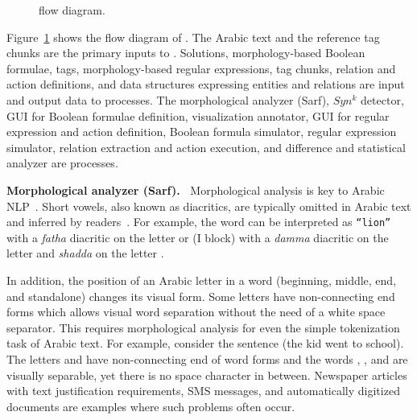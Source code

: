 \begin{figure}[tb!]
\centering
{}
\caption{\framework flow diagram.}
\label{f:overview}
\end{figure}

Figure~\ref{f:overview} shows the flow diagram of \framework. 
The Arabic text and the reference tag chunks are the primary inputs to \framework.
Solutions, morphology-based Boolean formulae, tags, 
morphology-based regular expressions, 
tag chunks, relation and action definitions, and data structures expressing entities 
and relations are input and output data to \framework processes. 
The morphological analyzer (Sarf), $Syn^k$ detector, 
GUI for Boolean formulae definition, 
visualization annotator, GUI for regular expression and action definition, 
Boolean formula simulator, regular expression simulator, 
relation extraction and action execution, and difference and statistical analyzer 
are \framework processes.

\def\pp{\ensuremath{{\cal P}}} %
\def\ss{\ensuremath{{\cal S}}} %
\def\xx{\ensuremath{{\cal X}}} %
\def\PP{\ensuremath{\mathit{POS}}} %
\def\GG{\ensuremath{\mathit{GLOSS}}} %
\def\AC{\ensuremath{\mathit{CAT}}} %

{\bf Morphological analyzer (Sarf).~}
\label{s:s:morph}
Morphological analysis is key to Arabic NLP~\cite{arabicmorph}.
Short vowels, also known as diacritics, are typically omitted in Arabic text
and inferred by readers~\cite{habash2006arabic}. 
For example, the word %
can be interpreted as  {\tt ``lion''} with a {\em fatha} diacritic on the 
letter  or 
\vocalize {} (I block) with a 
{\em damma} diacritic on the letter  and {\em shadda} on the letter .

In addition, the position of an Arabic letter in a word 
(beginning, middle, end, and standalone) changes
its visual form.
Some letters have non-connecting end forms which allows visual
word separation without the need of a white space separator. 
This requires morphological analysis for even the simple tokenization 
task of Arabic text.
For example, consider the sentence 
\arabfalse {} \arabtrue
(the kid went to school). 
The letters  and  have 
non-connecting end of word forms and the words 
, , and   
are visually separable, 
yet there is no space character in between.
Newspaper articles with text justification requirements, 
SMS messages, and automatically digitized documents
are examples where such problems often occur. 

